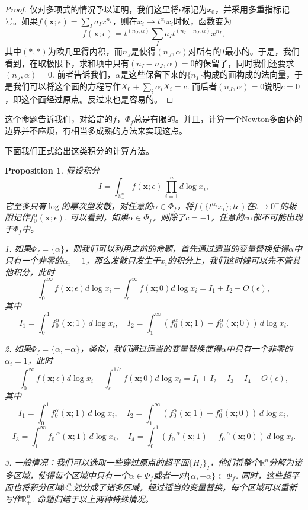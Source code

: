 \documentclass[11pt]{article}
\theoremstyle{definition}
\theoremstyle{plain}
\newtheorem{pro}[para]{Proposition}
\begin{document}
\begin{proof}
仅对多项式的情况予以证明，我们这里将$\epsilon$标记为$x_0$，并采用多重指标记号。如果$f(\mathbf{x};\epsilon)=\sum_I a_I x^{n_I}$，则在$x_i\to t^{\alpha_i}x_i$时候，函数变为
\[
	f(\mathbf{x};\epsilon)=t^{(n_J,\alpha)}\sum_I a_I t^{(n_I-n_J,\alpha)}x^{n_I},
\]
其中$(*,*)$为欧几里得内积，而$n_J$是使得$(n_J,\alpha)$对所有的$I$最小的。于是，我们看到，在取极限下，求和项中只有$(n_I-n_J,\alpha)=0$的保留了，同时我们还要求$(n_J,\alpha)=0$. 前者告诉我们，$\alpha$是这些保留下来的$\{n_I\}$构成的面构成的法向量，于是我们可以将这个面的方程写作$X_0+\sum_{i}\alpha_i X_i=c$. 而后者$(n_J,\alpha)=0$说明$c=0$，即这个面经过原点。反过来也是容易的。
\end{proof}

这个命题告诉我们，对给定的$f$，$\Phi_f$总是有限的。并且，计算一个Newton多面体的边界并不麻烦，有相当多成熟的方法来实现这点。

下面我们正式给出这类积分的计算方法。

\begin{pro}
假设积分
	\[
		I=\int_{\mathbb R_+^n} f(\mathbf{x};\epsilon)\,\prod_{i=1}^n d\log x_i,
	\]
它至多只有$\log$的幂次型发散，对任意的$\alpha\in \Phi_f$，将$f(\{t^{\alpha_i}x_i\};t\epsilon)$在$t\to 0^+$的极限记作$f_0^\alpha(\mathbf{x};\epsilon)$. 可以看到，如果$\alpha\in \Phi_f$，则除了$c=-1$，任意的$c\alpha$都不可能出现于$\Phi_f$中。

1. 如果$\Phi_f=\{\alpha\}$，则我们可以利用之前的命题，首先通过适当的变量替换使得$\alpha$中只有一个非零的$\alpha_i=1$，那么发散只发生于$x_i$的积分上，我们这时候可以先不管其他积分，此时
\[
	\int_{0}^\infty f(\mathbf{x};\epsilon)d\log x_i-\int_{\epsilon}^\infty f(\mathbf{x};0)d\log x_i=I_1+I_2+O(\epsilon),
\]
其中
\[
	I_1=\int_{0}^1f_0^{\alpha}(\mathbf{x};1)\,d\log x_i,\quad I_2=\int_{1}^\infty (f^{\alpha}_0(\mathbf x;1)-f^{\alpha}_0(\mathbf x;0))\,d\log x_i.
\]

2. 如果$\Phi_f=\{\alpha,-\alpha\}$，类似，我们通过适当的变量替换使得$\alpha$中只有一个非零的$\alpha_i=1$，此时
\[
	\int_{0}^\infty f(\mathbf{x};\epsilon)d\log x_i-\int_{\epsilon}^{1/\epsilon} f(\mathbf{x};0)d\log x_i=I_1+I_2+I_3+I_4+O(\epsilon),
\]
其中
\[
	I_1=\int_{0}^1f_0^{\alpha}(\mathbf{x};1)\,d\log x_i,\quad I_2=\int_{1}^\infty (f^{\alpha}_0(\mathbf x;1)-f^{\alpha}_0(\mathbf x;0))\,d\log x_i,
\]
\[
	I_3=\int_{1}^\infty f_0^{-\alpha}(\mathbf{x};1)\,d\log x_i,\quad I_4=\int_{0}^1 (f^{-\alpha}_0(\mathbf x;1)-f^{-\alpha}_0(\mathbf x;0))\,d\log x_i.
\]

3. 一般情况：我们可以选取一些穿过原点的超平面$\{H_I\}_I$，他们将整个$\mathbb R^n$分解为诸多区域，使得每个区域中只有一个$\alpha\in \Phi_f$或者一对$\{\alpha,-\alpha\}\subset \Phi_f$. 同时，这些超平面也将积分区域$\mathbb R_+^n$划分成了诸多区域，经过适当的变量替换，每个区域可以重新写作$\mathbb R_+^n$. 命题归结于以上两种特殊情况。
\end{pro}
\end{document}
